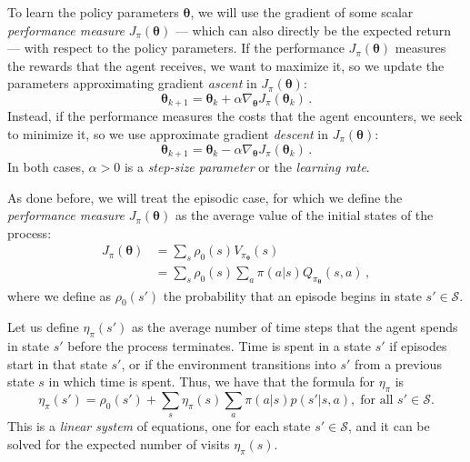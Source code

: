 To learn the policy parameters $\boldsymbol \theta$, we will use the  gradient of some scalar \emph{performance measure} $J_\pi(\boldsymbol \theta)$ --- which can also directly be the expected return --- with respect to the policy parameters. If the performance $J_\pi(\boldsymbol \theta)$ measures the rewards that the agent receives, we want to maximize it, so we update the parameters approximating gradient \textit{ascent} in $J_\pi(\boldsymbol \theta)$:
\begin{equation}
    \boldsymbol \theta_{k+1} = \boldsymbol \theta_k + \alpha \nabla_{\boldsymbol \theta} J_\pi(\boldsymbol \theta_k) \, .
    \label{eq:grad-ascent}
\end{equation}
Instead, if the performance measures the costs that the agent encounters, we seek to minimize it, so we use approximate gradient \textit{descent} in $J_\pi(\boldsymbol \theta)$:
\begin{equation}
    \boldsymbol \theta_{k+1} = \boldsymbol \theta_k - \alpha \nabla_{\boldsymbol \theta} J_\pi(\boldsymbol \theta_k) \, .
    \label{eq:grad-descent}
\end{equation}
In both cases, $\alpha > 0$ is a \emph{step-size parameter} or the \emph{learning rate}.

As done before, we will treat the episodic case, for which we define the \emph{performance measure} $J_\pi(\boldsymbol \theta)$ as the average value of the initial states of the process:
\begin{equation}
    \begin{aligned}
        J_\pi (\boldsymbol \theta) 
        &= \sum_s \rho_0(s) V_{\pi_{\boldsymbol \theta}}(s) \\
        &= \sum_s \rho_0(s) \sum_a \pi(a|s) Q_{\pi_{\boldsymbol \theta}}(s, a) \, ,
    \end{aligned}
    \label{eq:J}
\end{equation}
where we define as $\rho_0(s')$ the probability that an episode begins in state $s' \in \mathcal S$.

Let us define $\eta_\pi(s')$ as the average number of time steps that the agent spends in state $s'$ before the process terminates. Time is spent in a state $s'$ if episodes start in that state $s'$, or if the environment transitions into $s'$ from a previous state $s$ in which time is spent. Thus, we have that the formula for $\eta_\pi$ is
\begin{equation}
    \eta_\pi(s') = \rho_0(s') + \sum_s \eta_\pi(s) \sum_a \pi(a|s) p(s'|s, a), \; \text{for all } s' \in \mathcal S.
    \label{eq:eta}
\end{equation}
This is a \textit{linear system} of equations, one for each state $s' \in \mathcal S$, and it can be solved for the expected number of visits $\eta_\pi(s)$.

